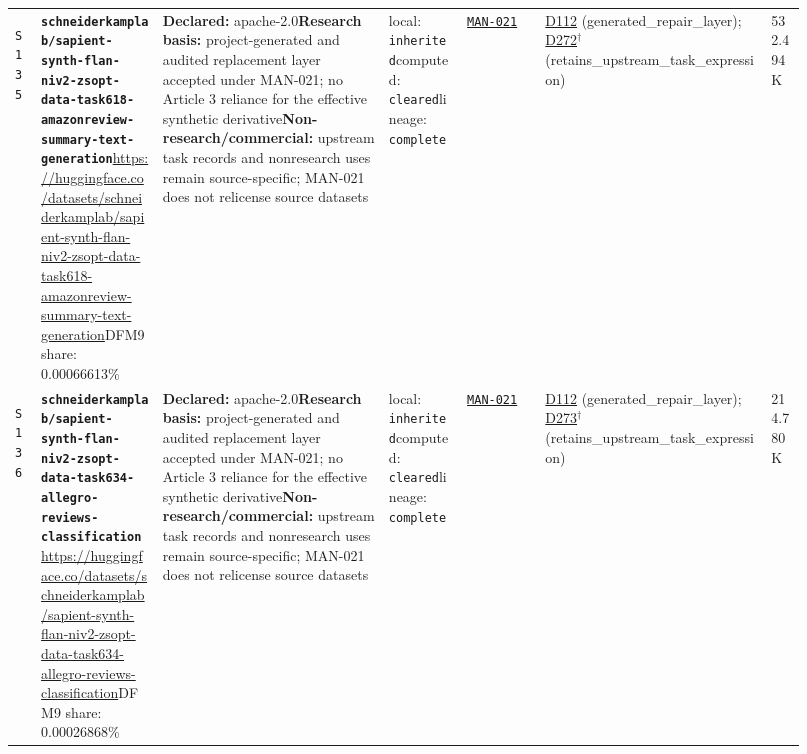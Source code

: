 \documentclass[9pt,a4paper]{article}
\newcommand{\srcid}[1]{\hypertarget{src:#1}{\texttt{#1}}}
\begin{document}
\begin{landscape}
\begin{longtable}{@{}L{0.03\linewidth}L{0.14\linewidth}L{0.26\linewidth}L{0.09\linewidth}L{0.09\linewidth}L{0.265\linewidth}L{0.045\linewidth}@{}}
\srcid{S135} & \textbf{\nolinkurl{schneiderkamplab/sapient-synth-flan-niv2-zsopt-data-task618-amazonreview-summary-text-generation}}\newline \url{https://huggingface.co/datasets/schneiderkamplab/sapient-synth-flan-niv2-zsopt-data-task618-amazonreview-summary-text-generation}\newline DFM9 share: 0.00066613\% & \textbf{Declared:} apache-2.0\newline \textbf{Research basis:} project-generated and audited replacement layer accepted under MAN-021; no Article 3 reliance for the effective synthetic derivative\newline \textbf{Non-research/commercial:} upstream task records and nonresearch uses remain source-specific; MAN-021 does not relicense source datasets & local: \texttt{inherited}\newline computed: \texttt{cleared}\newline lineage: \texttt{complete} & \hyperlink{manual:MAN-021}{\texttt{MAN-021}} & \hyperlink{dep:D112}{D112} (generated\_repair\_layer); \hyperlink{dep:D272}{D272}$^{\dagger}$ (retains\_upstream\_task\_expression) & 532.494K \\
\srcid{S136} & \textbf{\nolinkurl{schneiderkamplab/sapient-synth-flan-niv2-zsopt-data-task634-allegro-reviews-classification}}\newline \url{https://huggingface.co/datasets/schneiderkamplab/sapient-synth-flan-niv2-zsopt-data-task634-allegro-reviews-classification}\newline DFM9 share: 0.00026868\% & \textbf{Declared:} apache-2.0\newline \textbf{Research basis:} project-generated and audited replacement layer accepted under MAN-021; no Article 3 reliance for the effective synthetic derivative\newline \textbf{Non-research/commercial:} upstream task records and nonresearch uses remain source-specific; MAN-021 does not relicense source datasets & local: \texttt{inherited}\newline computed: \texttt{cleared}\newline lineage: \texttt{complete} & \hyperlink{manual:MAN-021}{\texttt{MAN-021}} & \hyperlink{dep:D112}{D112} (generated\_repair\_layer); \hyperlink{dep:D273}{D273}$^{\dagger}$ (retains\_upstream\_task\_expression) & 214.780K \\

\end{longtable}
\end{landscape}
\end{document}
